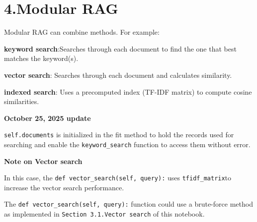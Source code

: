 \documentclass[11pt]{article}
\begin{document}
    \section{4.Modular RAG}\label{modular-rag}

Modular RAG can combine methods. For example:

\textbf{keyword search}:Searches through each document to find the one
that best matches the keyword(s).

\textbf{vector search}: Searches through each document and calculates
similarity.

\textbf{indexed search}: Uses a precomputed index (TF-IDF matrix) to
compute cosine similarities.

    \textbf{October 25, 2025 update}

\texttt{self.documents} is initialized in the fit method to hold the
records used for searching and enable the \texttt{keyword\_search}
function to access them without error.

\textbf{Note on Vector search}

In this case, the \texttt{def\ vector\_search(self,\ query):} uses
\texttt{tfidf\_matrix}to increase the vector search performance.

The \texttt{def\ vector\_search(self,\ query):} function could use a
brute-force method as implemented in
\texttt{Section\ 3.1.Vector\ search} of this notebook.
\end{document}
